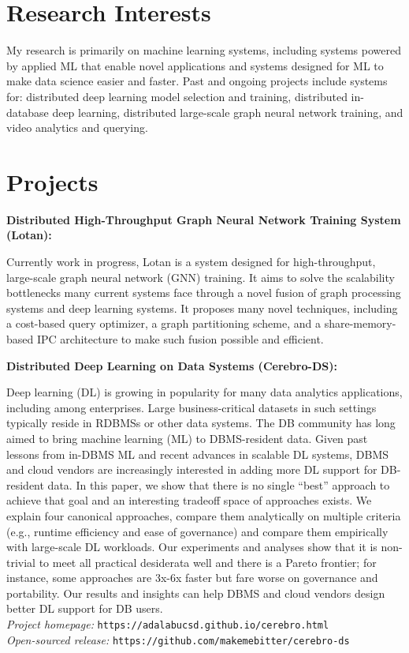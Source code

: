 \documentclass[margin,line]{res}
\begin{document}
\begin{resume}
\section{\sc Research Interests}
My research is primarily on machine learning systems, including systems powered by applied ML that enable novel applications and systems designed for ML to make data science easier and faster. Past and ongoing projects include systems for: distributed deep learning model selection and training, distributed in-database deep learning, distributed large-scale graph neural network training, and video analytics and querying.

\section{\sc Projects}
{\bf Distributed High-Throughput Graph Neural Network Training System (Lotan):}

Currently work in progress, Lotan is a system designed for high-throughput, large-scale graph neural network (GNN) training. It aims to solve the scalability bottlenecks many current systems face through a novel fusion of graph processing systems and deep learning systems. It proposes many novel techniques, including a cost-based query optimizer, a graph partitioning scheme, and a share-memory-based IPC architecture to make such fusion possible and efficient. 

{\bf Distributed Deep Learning on Data Systems (Cerebro-DS):}

Deep learning (DL) is growing in popularity for many data analytics applications, including among enterprises. Large business-critical datasets in such settings typically reside in RDBMSs or other data systems. The DB community has long aimed to bring machine learning (ML) to DBMS-resident data. Given past lessons from in-DBMS ML and recent advances in scalable DL systems, DBMS and cloud vendors are increasingly interested in adding more DL support for DB-resident data. In this paper, we show that there is no single ``best'' approach to achieve that goal and an interesting tradeoff space of approaches exists. We explain four canonical approaches, compare them analytically on multiple criteria (e.g., runtime efficiency and ease of governance) and compare them empirically with large-scale DL workloads. Our experiments and analyses show that it is non-trivial to meet all practical desiderata well and there is a Pareto frontier; for instance, some approaches are 3x-6x faster but fare worse on governance and portability. Our results and insights can help DBMS and cloud vendors design better DL support for DB users.\\
\textit{Project homepage: }\texttt{https://adalabucsd.github.io/cerebro.html}\\
\textit{Open-sourced release: }\texttt{https://github.com/makemebitter/cerebro-ds}


\end{resume}
\end{document}
